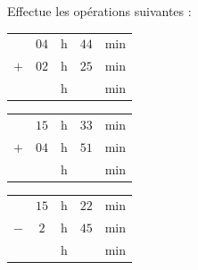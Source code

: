\begin{pageParcoursd}

 
 Effectue  les opérations suivantes :
 
\begin{minipage}{0.30\linewidth}
\begin{tabular}{ccccc} 
& $04$ & h &  $44$ & min \\ 
$+$   & $02$ & h & $25$  & min\\ 
\hline 
   &  & h & & min\\
\end{tabular} 
\end{minipage}
\hfill 
\begin{minipage}{0.30\linewidth}
 \begin{tabular}{ccccc} 
& $15$ & h &  $33$ & min \\ 
$+$   & $04$ & h &  $51$ & min\\ 
\hline 
   &  & h & & min\\
\end{tabular} 
\end{minipage}
\hfill 
\begin{minipage}{0.30\linewidth}
 \begin{tabular}{ccccc} 
& $15$ & h & $22$  & min \\ 
$-$   & $2$ & h & $45$ & min\\ 
\hline 
   &  & h & & min\\
\end{tabular} 
\end{minipage}






\end{pageParcoursd}
